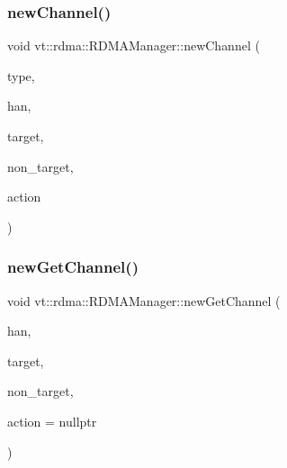 \mbox{\label{structvt_1_1rdma_1_1_r_d_m_a_manager_add2a57acf8b38758b2e53f71d92d452a}} 
\subsubsection{\texorpdfstring{new\+Channel()}{newChannel()}}
{\footnotesize\ttfamily void vt\+::rdma\+::\+R\+D\+M\+A\+Manager\+::new\+Channel (\begin{DoxyParamCaption}\item[{\hyperlink{namespacevt_1_1rdma_ac848e1d9da43db6294bd06f83e5d3946}{R\+D\+M\+A\+\_\+\+Type\+Type} const \&}]{type,  }\item[{\hyperlink{namespacevt_a10442579ec4e7ebef223818e64bcf908}{R\+D\+M\+A\+\_\+\+Handle\+Type} const \&}]{han,  }\item[{\hyperlink{namespacevt_a866da9d0efc19c0a1ce79e9e492f47e2}{Node\+Type} const \&}]{target,  }\item[{\hyperlink{namespacevt_a866da9d0efc19c0a1ce79e9e492f47e2}{Node\+Type} const \&}]{non\+\_\+target,  }\item[{\hyperlink{namespacevt_ae0a5a7b18cc99d7b732cb4d44f46b0f3}{Action\+Type} const \&}]{action }\end{DoxyParamCaption})}

\mbox{\label{structvt_1_1rdma_1_1_r_d_m_a_manager_af300aa329bab5b4fe851025525659454}} 
\subsubsection{\texorpdfstring{new\+Get\+Channel()}{newGetChannel()}\hspace{0.1cm}{\footnotesize\ttfamily [1/2]}}
{\footnotesize\ttfamily void vt\+::rdma\+::\+R\+D\+M\+A\+Manager\+::new\+Get\+Channel (\begin{DoxyParamCaption}\item[{\hyperlink{namespacevt_a10442579ec4e7ebef223818e64bcf908}{R\+D\+M\+A\+\_\+\+Handle\+Type} const \&}]{han,  }\item[{\hyperlink{structvt_1_1rdma_1_1_r_d_m_a_manager_a106350721a187d2cfb94a9017ef66a07}{R\+D\+M\+A\+\_\+\+Endpoint\+Type} const \&}]{target,  }\item[{\hyperlink{structvt_1_1rdma_1_1_r_d_m_a_manager_a106350721a187d2cfb94a9017ef66a07}{R\+D\+M\+A\+\_\+\+Endpoint\+Type} const \&}]{non\+\_\+target,  }\item[{\hyperlink{namespacevt_ae0a5a7b18cc99d7b732cb4d44f46b0f3}{Action\+Type} const \&}]{action = {\ttfamily nullptr} }\end{DoxyParamCaption})\hspace{0.3cm}{\ttfamily [inline]}}

